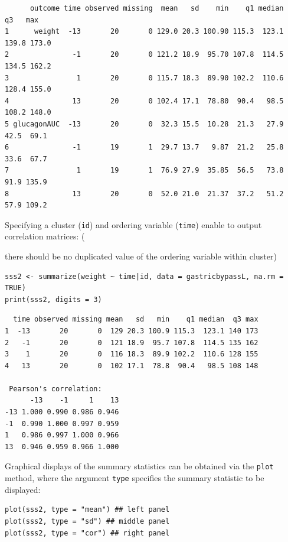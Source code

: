 \documentclass[12pt]{article}
\newcommand\Warning[1][3ex]{%
\renewcommand\stacktype{L}%
\scaleto{\stackon[1.3pt]{\color{red}$\triangle$}{\tiny\bfseries !}}{#1}%
\xspace
}
\begin{document}
\begin{verbatim}
      outcome time observed missing  mean   sd    min    q1 median    q3   max
1      weight  -13       20       0 129.0 20.3 100.90 115.3  123.1 139.8 173.0
2               -1       20       0 121.2 18.9  95.70 107.8  114.5 134.5 162.2
3                1       20       0 115.7 18.3  89.90 102.2  110.6 128.4 155.0
4               13       20       0 102.4 17.1  78.80  90.4   98.5 108.2 148.0
5 glucagonAUC  -13       20       0  32.3 15.5  10.28  21.3   27.9  42.5  69.1
6               -1       19       1  29.7 13.7   9.87  21.2   25.8  33.6  67.7
7                1       19       1  76.9 27.9  35.85  56.5   73.8  91.9 135.9
8               13       20       0  52.0 21.0  21.37  37.2   51.2  57.9 109.2
\end{verbatim}


\noindent Specifying a cluster (\texttt{id}) and ordering variable (\texttt{time})
enable to output correlation matrices: \newline (\Warning there should be
no duplicated value of the ordering variable within cluster)
\lstset{language=r,label= ,caption= ,captionpos=b,numbers=none}
\begin{lstlisting}
sss2 <- summarize(weight ~ time|id, data = gastricbypassL, na.rm = TRUE)
print(sss2, digits = 3)
\end{lstlisting}

\begin{verbatim}
  time observed missing mean   sd   min    q1 median  q3 max
1  -13       20       0  129 20.3 100.9 115.3  123.1 140 173
2   -1       20       0  121 18.9  95.7 107.8  114.5 135 162
3    1       20       0  116 18.3  89.9 102.2  110.6 128 155
4   13       20       0  102 17.1  78.8  90.4   98.5 108 148

 Pearson's correlation: 
      -13    -1     1    13
-13 1.000 0.990 0.986 0.946
-1  0.990 1.000 0.997 0.959
1   0.986 0.997 1.000 0.966
13  0.946 0.959 0.966 1.000
\end{verbatim}

Graphical displays of the summary statistics can be obtained via the
\texttt{plot} method, where the argument \texttt{type} specifies the summary
statistic to be displayed:
\lstset{language=r,label= ,caption= ,captionpos=b,numbers=none}
\begin{lstlisting}
plot(sss2, type = "mean") ## left panel
plot(sss2, type = "sd") ## middle panel
plot(sss2, type = "cor") ## right panel
\end{lstlisting}
\end{document}
